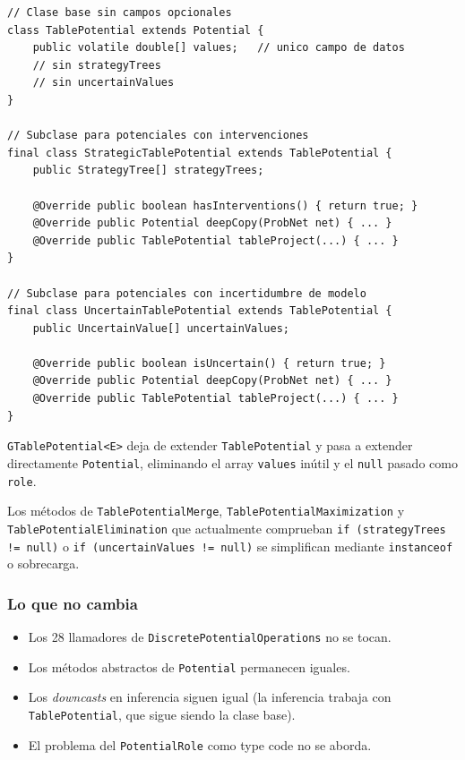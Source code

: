\documentclass[11pt,a4paper]{article}
\newcommand{\code}[1]{\texttt{#1}}
\begin{document}
\begin{lstlisting}[caption={Jerarquía resultante de la Opción 1}]
// Clase base sin campos opcionales
class TablePotential extends Potential {
    public volatile double[] values;   // unico campo de datos
    // sin strategyTrees
    // sin uncertainValues
}

// Subclase para potenciales con intervenciones
final class StrategicTablePotential extends TablePotential {
    public StrategyTree[] strategyTrees;

    @Override public boolean hasInterventions() { return true; }
    @Override public Potential deepCopy(ProbNet net) { ... }
    @Override public TablePotential tableProject(...) { ... }
}

// Subclase para potenciales con incertidumbre de modelo
final class UncertainTablePotential extends TablePotential {
    public UncertainValue[] uncertainValues;

    @Override public boolean isUncertain() { return true; }
    @Override public Potential deepCopy(ProbNet net) { ... }
    @Override public TablePotential tableProject(...) { ... }
}
\end{lstlisting}

\code{GTablePotential<E>} deja de extender \code{TablePotential} y pasa a extender
directamente \code{Potential}, eliminando el array \code{values} inútil y el
\code{null} pasado como \code{role}.

Los métodos de \code{Table\-Potential\-Merge}, \code{Table\-Potential\-Maximization} y
\code{Table\-Potential\-Elimination} que actualmente comprueban
\code{if (strategyTrees != null)} o \code{if (uncertainValues != null)} se
simplifican mediante \code{instanceof} o sobrecarga.

\subsubsection*{Lo que no cambia}

\begin{itemize}
  \item Los 28 llamadores de \code{DiscretePotentialOperations} no se tocan.
  \item Los métodos abstractos de \code{Potential} permanecen iguales.
  \item Los \emph{downcasts} en inferencia siguen igual (la inferencia trabaja con
        \code{TablePotential}, que sigue siendo la clase base).
  \item El problema del \code{PotentialRole} como type code no se aborda.
\end{itemize}
\end{document}
